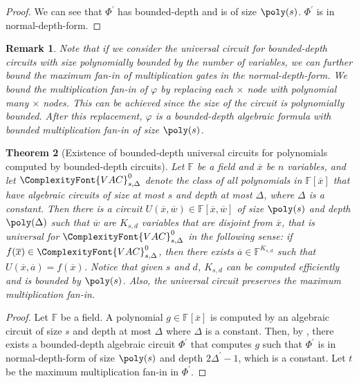 \documentclass[11pt,letter]{article}
\newtheorem{theorem}{Theorem}[section]
\newtheorem{remark}[theorem]{Remark}
\theoremstyle{remark} %
\newcommand{\VAC}{
    {
        \ComplexityFont{VAC}
    }
}
\begin{document}
{\begin{proof}
         We can see that $\Phi^\prime$ has bounded-depth and is of size $\poly(s)$. $\Phi^\prime$ is in normal-depth-form.
     \end{proof}

    \begin{remark}
        Note that if we consider the universal circuit for bounded-depth circuits with size polynomially bounded by the number of variables, we can further bound the maximum fan-in of multiplication gates in the normal-depth-form. 
        We bound the multiplication fan-in of $\varphi$ by replacing each $\times$ node with polynomial many $\times$ nodes. This can be achieved since the size of the circuit is polynomially bounded. After this replacement, $\varphi$ is a bounded-depth algebraic formula with bounded multiplication fan-in of size $\poly(s)$.
    \end{remark}
     


     \begin{theorem}[Existence of bounded-depth universal circuits for polynomials computed by bounded-depth circuits]
        \label{theorem: Existence of universal circuits for constant-depth polynomials}
         Let $\mathbb{F}$ be a field and $\overline{x}$ be $n$ variables, and let $\VAC^0_{s,\Delta}$ denote the class of all polynomials in $\mathbb{F}[\overline{x}]$ that have algebraic circuits of size at most $s$ and depth at most $\Delta$, where $\Delta$ is a constant. Then there is a circuit $U(\overline{x},\overline{w}) \in \mathbb{F}[\overline{x},\overline{w}]$ of size $\poly(s)$ and depth $\poly(\Delta)$ such that $\overline{w}$ are $K_{s,d}$ variables that are disjoint from $\overline{x}$, that is universal for $\VAC^0_{s,\Delta}$ in the following sense: if $f(\overline{x}) \in \VAC^0_{s,\Delta}$, then there exists $\overline{a} \in \mathbb{F}^{K_{s,d}}$ such that $U(\overline{x},\overline{a})=f(\overline{x})$. Notice that given $s$ and $d$, $K_{s,d}$ can be computed efficiently and is bounded by $\poly(s)$. Also, the universal circuit preserves the maximum multiplication fan-in.
     \end{theorem}
     \begin{proof}
         Let $\mathbb{F}$ be a field. A polynomial $g \in \mathbb{F}[\overline{x}]$ is computed by an algebraic circuit of size $s$ and depth at most $\Delta$ where $\Delta$ is a constant. Then, by , there exists a bounded-depth algebraic circuit $\Phi^\prime$ that computes $g$ such that $\Phi^\prime$ is in normal-depth-form of size $\poly(s)$ and depth $2\Delta^\prime-1$, which is a constant. Let $t$ be the maximum multiplication fan-in in $\Phi^\prime$.
         

\end{proof}}
\end{document}
